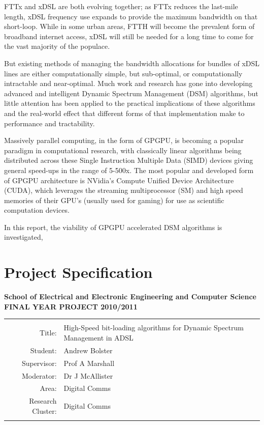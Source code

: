 FTTx and xDSL are both evolving together; as FTTx reduces the last-mile length, xDSL frequency use expands to provide the maximum bandwidth on that short-loop. While in some urban areas, FTTH will become the prevalent form of broadband internet access, xDSL will still be needed for a long time to come for the vast majority of the populace.

But existing methods of managing the bandwidth allocations for bundles of xDSL lines are either computationally simple, but sub-optimal, or computationally intractable and near-optimal. Much work and research has gone into developing advanced and intelligent Dynamic Spectrum Management (DSM) algorithms, but little attention has been applied to the practical implications of these algorithms and the real-world effect that different forms of that implementation make to performance and tractability.

Massively parallel computing, in the form of GPGPU, is becoming a popular paradigm in computational research, with classically linear algorithms being distributed across these Single Instruction Multiple Data (SIMD) devices giving general speed-ups in the range of 5-500x. The most popular and developed form of GPGPU architecture is NVidia's Compute Unified Device Architecture (CUDA), which leverages the streaming multiprocessor (SM) and high speed memories of their GPU's (usually used for gaming) for use as scientific computation devices. 

In this report, the viability of GPGPU accelerated DSM algorithms is investigated, 
\clearpage
\section{Project Specification}
\label{sec:proj-spec}
\begin{centering}
\textbf{School of Electrical and Electronic Engineering and Computer Science\\
FINAL YEAR PROJECT 2010/2011\\}
\end{centering}

\begin{tabular}{rl}
\\\\Title:&High-Speed bit-loading algorithms for Dynamic Spectrum Management in ADSL\\
Student:&Andrew Bolster\\
Supervisor:&Prof A Marshall\\
Moderator:&Dr J McAllister\\
Area:&Digital Comms\\
Research Cluster:&Digital Comms\\\\
\end{tabular}

